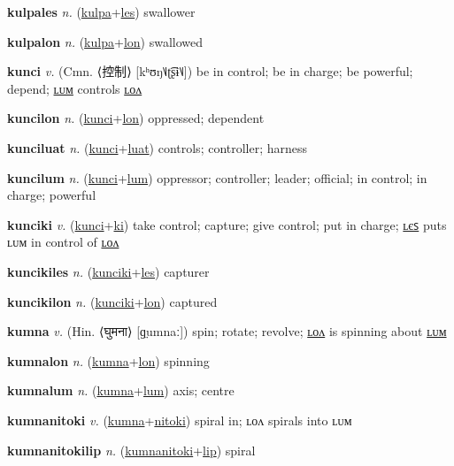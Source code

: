 \textbf{\hypertarget{kulpales}{kulpales}} \textit{n.} (\hyperlink{kulpa}{kulpa}+\allowbreak \hyperlink{les}{les})
swallower

\textbf{\hypertarget{kulpalon}{kulpalon}} \textit{n.} (\hyperlink{kulpa}{kulpa}+\allowbreak \hyperlink{lon}{lon})
swallowed

\textbf{\hypertarget{kunci}{kunci}} \textit{v.} (Cmn. ⟨{\chinese{}控制}⟩ [kʰʊŋ˥˩ʈ͡ʂɨ˥˩])
be in control; be in charge; be powerful; depend; \hyperlink{kuncilum}{ʟᴜᴍ} controls \hyperlink{kuncilon}{ʟᴏᴧ}

\textbf{\hypertarget{kuncilon}{kuncilon}} \textit{n.} (\hyperlink{kunci}{kunci}+\allowbreak \hyperlink{lon}{lon})
oppressed; dependent

\textbf{\hypertarget{kunciluat}{kunciluat}} \textit{n.} (\hyperlink{kunci}{kunci}+\allowbreak \hyperlink{luat}{luat})
controls; controller; harness

\textbf{\hypertarget{kuncilum}{kuncilum}} \textit{n.} (\hyperlink{kunci}{kunci}+\allowbreak \hyperlink{lum}{lum})
oppressor; controller; leader; official; in control; in charge; powerful

\textbf{\hypertarget{kunciki}{kunciki}} \textit{v.} (\hyperlink{kunci}{kunci}+\allowbreak \hyperlink{ki}{ki})
take control; capture; give control; put in charge; \hyperlink{kuncikiles}{ʟєꜱ} puts ʟᴜᴍ in control of \hyperlink{kuncikilon}{ʟᴏᴧ}

\textbf{\hypertarget{kuncikiles}{kuncikiles}} \textit{n.} (\hyperlink{kunciki}{kunciki}+\allowbreak \hyperlink{les}{les})
capturer

\textbf{\hypertarget{kuncikilon}{kuncikilon}} \textit{n.} (\hyperlink{kunciki}{kunciki}+\allowbreak \hyperlink{lon}{lon})
captured

\textbf{\hypertarget{kumna}{kumna}} \textit{v.} (Hin. ⟨{\devanagari{}घुमना}⟩ [ɡ̤umnaː])
spin; rotate; revolve; \hyperlink{kumnalon}{ʟᴏᴧ} is spinning about \hyperlink{kumnalum}{ʟᴜᴍ}

\textbf{\hypertarget{kumnalon}{kumnalon}} \textit{n.} (\hyperlink{kumna}{kumna}+\allowbreak \hyperlink{lon}{lon})
spinning

\textbf{\hypertarget{kumnalum}{kumnalum}} \textit{n.} (\hyperlink{kumna}{kumna}+\allowbreak \hyperlink{lum}{lum})
axis; centre

\textbf{\hypertarget{kumnanitoki}{kumnanitoki}} \textit{v.} (\hyperlink{kumna}{kumna}+\allowbreak \hyperlink{nitoki}{nitoki})
spiral in; ʟᴏᴧ spirals into ʟᴜᴍ

\textbf{\hypertarget{kumnanitokilip}{kumnanitokilip}} \textit{n.} (\hyperlink{kumnanitoki}{kumnanitoki}+\allowbreak \hyperlink{lip}{lip})
spiral

